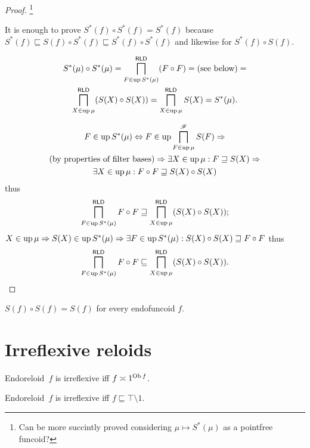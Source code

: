 \begin{proof}
\footnote{Can be more succintly proved considering $\mu \mapsto S^{\ast} (\mu)$ as a
pointfree funcoid?}

It is enough to prove $S^{\ast}(f)\circ S^{\ast}(f) = S^{\ast}(f)$ because
$S^{\ast}(f) \sqsubseteq S(f)\circ S^{\ast}(f) \sqsubseteq S^{\ast}(f)\circ S^{\ast}(f)$ and likewise for $S^{\ast}(f)\circ S(f)$.

\begin{multline*}
S^{\ast} (\mu) \circ S^{\ast} (\mu) = \bigsqcap^{\mathsf{RLD}}_{F
\in \operatorname{up} S^{\ast} (\mu)} (F \circ F) = \text{(see below)} = \\
\bigsqcap^{\mathsf{RLD}}_{X \in \operatorname{up} \mu} (S (X) \circ S (X)) =
\bigsqcap^{\mathsf{RLD}}_{X \in \operatorname{up} \mu} S (X) = S^{\ast}
(\mu).
\end{multline*}

\begin{multline*}
F \in \operatorname{up} S^{\ast} (\mu)
\Leftrightarrow
F \in \operatorname{up} \bigsqcap^{\mathscr{F}}_{F\in\operatorname{up}\mu} S(F)
\Rightarrow \\
\text{(by properties of filter bases)}
\Rightarrow \exists X \in \operatorname{up} \mu : F
\sqsupseteq S (X)
\Rightarrow \\ \exists X \in \operatorname{up} \mu : F \circ F
\sqsupseteq S (X) \circ S (X)
\end{multline*}
thus
\[ \bigsqcap^{\mathsf{RLD}}_{
    F \in \operatorname{up} S^{\ast} (\mu) } F \circ F \sqsupseteq
    \bigsqcap^{\mathsf{RLD}}_{ X \in \operatorname{up} \mu } (S (X) \circ S (X)) ; \]
$X \in \operatorname{up} \mu \Rightarrow S (X) \in \operatorname{up} S^{\ast} (\mu)
\Rightarrow \exists F \in \operatorname{up} S^{\ast} (\mu) : S (X) \circ S (X)
\sqsupseteq F \circ F$ thus
\[ \bigsqcap^{\mathsf{RLD}}_{
    F \in \operatorname{up} S^{\ast} (\mu) } F \circ F \sqsubseteq
    \bigsqcap^{\mathsf{RLD}}_{ X \in \operatorname{up} \mu } (S (X) \circ S (X)) . \]
\end{proof}

\begin{conjecture}
$S(f)\circ S(f)=S(f)$ for every endofuncoid $f$.\end{conjecture}

\section{Irreflexive reloids}

\begin{defn}
Endoreloid~$f$ is irreflexive iff $f\asymp 1^{\operatorname{Ob} f}$.
\end{defn}

\begin{prop}
Endoreloid~$f$ is irreflexive iff $f\sqsubseteq \top\setminus 1$.
\end{prop}

